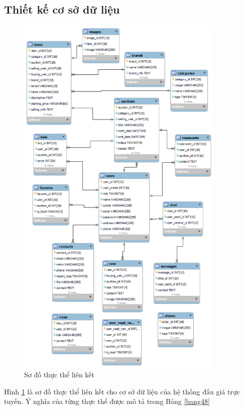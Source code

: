 \documentclass[../DoAn.tex]{subfiles}
\begin{document}
\subsection{Thiết kế cơ sở dữ liệu}
\begin{figure}[H]
    \centering
    \includegraphics[width=0.75\linewidth,height=18cm]{Hinhve/err2.png}
    \caption{Sơ đồ thực thể liên kết}
    \label{fig:Fig413}
\end{figure}
Hình \ref{fig:Fig413} là sơ đồ thực thể liên kết cho cơ sở dữ liệu của hệ thống đấu giá trực tuyến. Ý nghĩa của từng thực thể được mô tả trong Bảng  \ref{bang48}
    \tabletail{\hline}
    \label{bang48}
\end{document}
